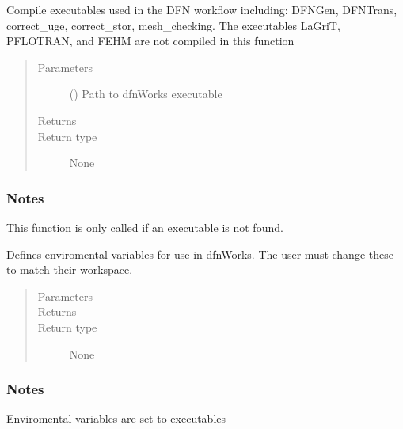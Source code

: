 \documentclass[letterpaper,10pt,english]{sphinxmanual}
\begin{document}
\begin{fulllineitems}
\label{\detokenize{pydfnworks:pydfnworks.general.paths.compile_dfn_exe}}
Compile executables used in the DFN workflow including: DFNGen, DFNTrans, correct\_uge, correct\_stor, mesh\_checking. The executables LaGriT, PFLOTRAN, and FEHM are not compiled in this function
\begin{quote}\begin{description}
\item[{Parameters}] \leavevmode
{} () \textendash{} Path to dfnWorks executable

\item[{Returns}] \leavevmode


\item[{Return type}] \leavevmode
None

\end{description}\end{quote}
\subsubsection*{Notes}

This function is only called if an executable is not found.

\end{fulllineitems}


\begin{fulllineitems}
\label{\detokenize{pydfnworks:pydfnworks.general.paths.define_paths}}
Defines enviromental variables for use in dfnWorks. The user must change these to match their workspace.
\begin{quote}\begin{description}
\item[{Parameters}] \leavevmode
{} \textendash{} 

\item[{Returns}] \leavevmode


\item[{Return type}] \leavevmode
None

\end{description}\end{quote}
\subsubsection*{Notes}

Enviromental variables are set to executables

\end{fulllineitems}
\end{document}
